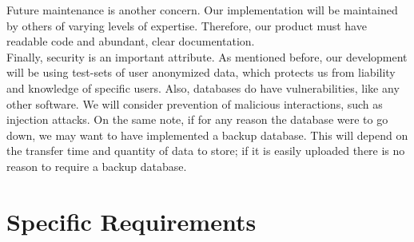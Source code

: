 \documentclass[letterpaper,10pt]{article}
\begin{document}
        \noindent Future maintenance is another concern. Our implementation will be maintained by others of varying levels of expertise. Therefore, our product must have readable code and abundant, clear documentation.\\
        
        \noindent Finally, security is an important attribute. As mentioned before, our development will be using test-sets of user anonymized data, which protects us from liability and knowledge of specific users. Also, databases do have vulnerabilities, like any other software. We will consider prevention of malicious interactions, such as injection attacks. On the same note, if for any reason the database were to go down, we may want to have implemented a backup database. This will depend on the transfer time and quantity of data to store; if it is easily uploaded there is no reason to require a backup database.

    \section{Specific Requirements}
\end{document}
